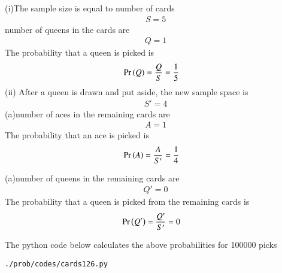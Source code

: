 (i)The sample size is equal to number of cards 
\begin{align}
S=5
\end{align}
number of queens in the cards are 
\begin{align}
Q=1
\end{align}
The probability that a queen is picked is 
\begin{align}
\Pr\left(Q\right) = \frac{Q}{S} &= \frac{1}{5}
\end{align}
(ii) After a queen is drawn and put aside, the new sample space is
\begin{align}
S'=4
\end{align}
(a)number of aces in the remaining cards are 
\begin{align}
A=1
\end{align}
The probability that an ace is picked is 
\begin{align}
\Pr\left(A\right) = \frac{A}{S'} &= \frac{1}{4}
\end{align}

(a)number of queens in the remaining cards are 
\begin{align}
Q'=0
\end{align}
The probability that a queen is picked from the remaining cards is 
\begin{align}
\Pr\left(Q'\right) = \frac{Q'}{S'} &= 0
\end{align}

The python code below calculates the above probabilities for 100000 picks
\begin{lstlisting}
./prob/codes/cards126.py
\end{lstlisting}
